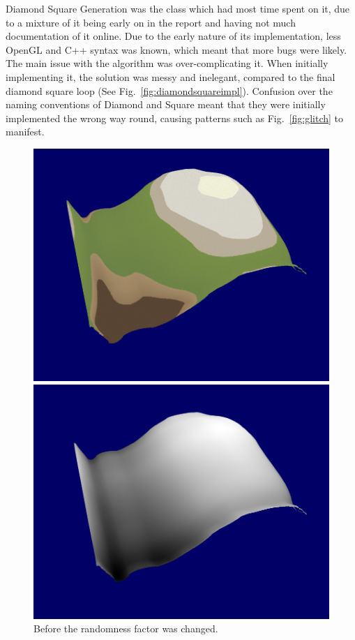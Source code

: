 \documentclass[a4paper,10pt]{report}
\begin{document}
Diamond Square Generation was the class which had most time spent on it, due to a mixture of it being early on in the report and having not much documentation of it online. Due to the early nature of its implementation, less OpenGL and C++ syntax was known, which meant that more bugs were likely. The main issue with the algorithm was over-complicating it. When initially implementing it, the solution was messy and inelegant, compared to the final diamond square loop (See Fig.~\ref{fig:diamondsquareimpl}). Confusion over the naming conventions of Diamond and Square meant that they were initially implemented the wrong way round, causing patterns such as Fig.~\ref{fig:glitch} to manifest. \medskip
\clearpage

\begin{figure}[h!]
\centering
\begin{minipage}{.4\textwidth}
  \centering
  \includegraphics[width=.9\linewidth]{Images/Sprint-Images/Sprint-7-Before-Colour.png}
    \end{minipage}%
\begin{minipage}{.4\textwidth}
  \centering
  \includegraphics[width=.9\linewidth]{Images/Sprint-Images/Sprint-7-Before-Greyscale.png}
\end{minipage}
\caption{Before the randomness factor was changed.}
\label{before-random}
\end{figure}
\end{document}
